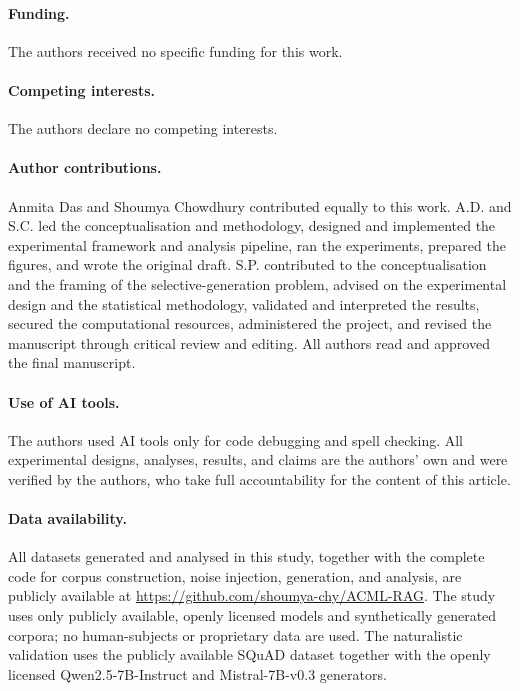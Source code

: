 \documentclass[sn-basic]{sn-jnl}
\theoremstyle{thmstyleone}
\theoremstyle{thmstyletwo}
\begin{document}
\backmatter

\paragraph{Funding.} The authors received no specific funding for this work.

\paragraph{Competing interests.} The authors declare no competing interests.

\paragraph{Author contributions.} Anmita Das and Shoumya Chowdhury
contributed equally to this work. A.D. and S.C. led the conceptualisation
and methodology, designed and implemented the experimental framework and
analysis pipeline, ran the experiments, prepared the figures, and wrote the
original draft. S.P. contributed to the conceptualisation and the framing of
the selective-generation problem, advised on the experimental design and the
statistical methodology, validated and interpreted the results, secured the
computational resources, administered the project, and revised the manuscript
through critical review and editing. All authors read and approved the final
manuscript.

\paragraph{Use of AI tools.} The authors used AI tools only for code
debugging and spell checking. All experimental designs, analyses, results,
and claims are the authors' own and were verified by the authors, who take
full accountability for the content of this article.

\paragraph{Data availability.} All datasets generated and analysed in this
study, together with the complete code for corpus construction, noise
injection, generation, and analysis, are publicly available at
\url{https://github.com/shoumya-chy/ACML-RAG}. The
study uses only publicly available, openly licensed models and synthetically
generated corpora; no human-subjects or proprietary data are used. The
naturalistic validation uses the publicly available SQuAD dataset together
with the openly licensed Qwen2.5-7B-Instruct and Mistral-7B-v0.3 generators.


\end{document}

